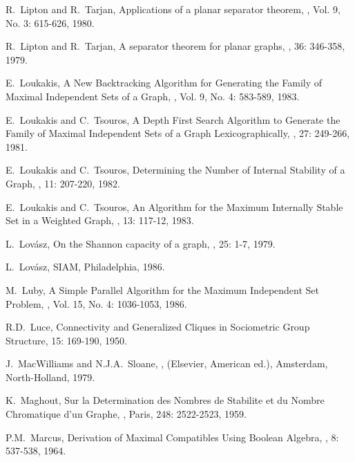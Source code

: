 \begin{thebibliography}{10}
R.~Lipton and R.~Tarjan,
\newblock Applications of a planar separator theorem,
, Vol. 9, No. 3: 615-626, 1980.

R.~Lipton and R.~Tarjan,
\newblock A separator theorem for planar graphs,
, 36: 346-358, 1979.

E.~Loukakis,
\newblock A New Backtracking Algorithm for Generating the Family of
Maximal Independent Sets of a Graph,
, Vol. 9, No. 4:
583-589, 1983.

E.~Loukakis and C.~Tsouros,
\newblock A Depth First Search Algorithm to Generate the Family of
Maximal Independent Sets of a Graph Lexicographically,
, 27: 249-266, 1981.

E.~Loukakis and C.~Tsouros,
\newblock Determining the Number of Internal Stability of a Graph,
, 11: 207-220, 1982.

E.~Loukakis and C.~Tsouros,
\newblock An Algorithm for the Maximum Internally Stable Set in a
Weighted Graph,
, 13: 117-12, 1983.

L.~Lov\'{a}sz,
\newblock On the Shannon capacity of a graph,
, 25: 1-7,
1979.

L.~Lov\'{a}sz,
\newblock SIAM, Philadelphia, 1986.

M.~Luby,
\newblock A Simple Parallel Algorithm for the Maximum Independent
Set Problem,
, Vol. 15, No. 4: 1036-1053, 1986.

R.D.~Luce,
\newblock Connectivity and Generalized Cliques in Sociometric Group
Structure,
 15: 169-190, 1950.

J.~MacWilliams and N.J.A.~Sloane,
,
\newblock (Elsevier, American ed.), Amsterdam, North-Holland, 1979.

K.~Maghout,
\newblock Sur la Determination des Nombres de Stabilite et du Nombre
Chromatique d'un Graphe,
, Paris, 248: 2522-2523, 1959.

P.M.~Marcus,
\newblock Derivation of Maximal Compatibles Using Boolean Algebra,
, 8: 537-538, 1964.


\end{thebibliography}
